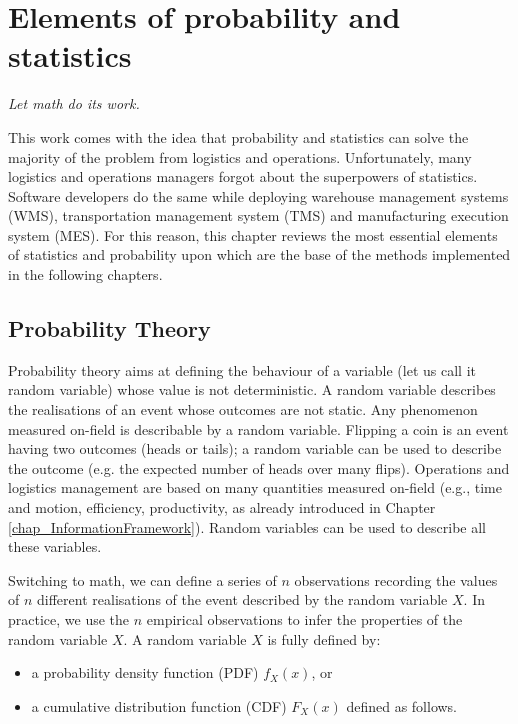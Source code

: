 \chapter{Elements of probability and statistics}

\epigraph{\textit{Let math do its work.}}{}

This work comes with the idea that probability and statistics can solve the majority of the problem from logistics and operations. Unfortunately, many logistics and operations managers forgot about the superpowers of statistics. Software developers do the same while deploying warehouse management systems (WMS), transportation management system (TMS) and manufacturing execution system (MES). For this reason, this chapter reviews the most essential elements of statistics and probability upon which are the base of the methods implemented in the following chapters. 

\section{Probability Theory}
Probability theory aims at defining the behaviour of a variable (let us call it random variable) whose value is not deterministic. A random variable describes the realisations of an event whose outcomes are not static. Any phenomenon measured on-field is describable by a random variable. Flipping a coin is an event having two outcomes (heads or tails); a random variable can be used to describe the outcome (e.g. the expected number of heads over many flips). Operations and logistics management are based on many quantities measured on-field (e.g., time and motion, efficiency, productivity, as already introduced in Chapter \ref{chap_InformationFramework}). Random variables can be used to describe all these variables. 

Switching to math, we can define a series of $n$ observations recording the values of $n$ different realisations of the event described by the random variable $X$. In practice, we use the $n$ empirical observations to infer the properties of the random variable $X$. A random variable $X$ is fully defined by:
\begin{itemize}
    \item 	a probability density function (PDF) $f_X (x)$, or
    \item 	a cumulative distribution function (CDF) $F_X (x)$ defined as follows.
\end{itemize}

